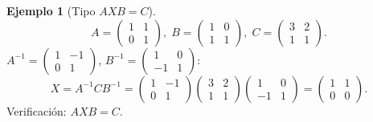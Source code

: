 \documentclass[a4paper,12pt]{article}
\theoremstyle{definition}
\newtheorem{ejemplo}{Ejemplo}[section]
\begin{document}
\begin{ejemplo}[Tipo $AXB=C$]
\[
A=\begin{pmatrix} 1 & 1 \\ 0 & 1 \end{pmatrix}, \; B=\begin{pmatrix} 1 & 0 \\ 1 & 1 \end{pmatrix}, \; C=\begin{pmatrix} 3 & 2 \\ 1 & 1 \end{pmatrix}.
\]
$A^{-1}=\begin{pmatrix} 1 & -1 \\ 0 & 1 \end{pmatrix}$, $B^{-1}=\begin{pmatrix} 1 & 0 \\ -1 & 1 \end{pmatrix}$:
\[
X=A^{-1}CB^{-1}=\begin{pmatrix} 1 & -1 \\ 0 & 1 \end{pmatrix}\begin{pmatrix} 3 & 2 \\ 1 & 1 \end{pmatrix}\begin{pmatrix} 1 & 0 \\ -1 & 1 \end{pmatrix}=\begin{pmatrix} 1 & 1 \\ 0 & 0 \end{pmatrix}.
\]
Verificación: $AXB=C$.
\end{ejemplo}
\end{document}
